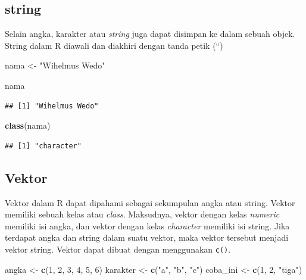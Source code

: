 \documentclass[]{book}
\newenvironment{Shaded}{\begin{snugshade}}{\end{snugshade}}
\newcommand{\KeywordTok}[1]{\textcolor[rgb]{0.13,0.29,0.53}{\textbf{#1}}}
\newcommand{\DecValTok}[1]{\textcolor[rgb]{0.00,0.00,0.81}{#1}}
\newcommand{\StringTok}[1]{\textcolor[rgb]{0.31,0.60,0.02}{#1}}
\newcommand{\NormalTok}[1]{#1}
\begin{document}
\subsection{string}\label{string}

Selain angka, karakter atau \emph{string} juga dapat disimpan ke dalam
sebuah objek. String dalam R diawali dan diakhiri dengan tanda petik
(``)

\begin{Shaded}
\begin{Highlighting}[]
\NormalTok{nama <-}\StringTok{ "Wihelmus Wedo"}

\NormalTok{nama}
\end{Highlighting}
\end{Shaded}

\begin{verbatim}
## [1] "Wihelmus Wedo"
\end{verbatim}

\begin{Shaded}
\begin{Highlighting}[]
\KeywordTok{class}\NormalTok{(nama)}
\end{Highlighting}
\end{Shaded}

\begin{verbatim}
## [1] "character"
\end{verbatim}

\subsection{Vektor}\label{vektor}

Vektor dalam R dapat dipahami sebagai sekumpulan angka atau string.
Vektor memiliki sebuah kelas atau \emph{class}. Maksudnya, vektor dengan
kelas \emph{numeric} memiliki isi angka, dan vektor dengan kelas
\emph{character} memiliki isi string. Jika terdapat angka dan string
dalam suatu vektor, maka vektor tersebut menjadi vektor string. Vektor
dapat dibuat dengan menggunakan \texttt{c()}.

\begin{Shaded}
\begin{Highlighting}[]
\NormalTok{angka <-}\StringTok{ }\KeywordTok{c}\NormalTok{(}\DecValTok{1}\NormalTok{, }\DecValTok{2}\NormalTok{, }\DecValTok{3}\NormalTok{, }\DecValTok{4}\NormalTok{, }\DecValTok{5}\NormalTok{, }\DecValTok{6}\NormalTok{)}
\NormalTok{karakter <-}\StringTok{ }\KeywordTok{c}\NormalTok{(}\StringTok{"a"}\NormalTok{, }\StringTok{"b"}\NormalTok{, }\StringTok{"c"}\NormalTok{)}
\NormalTok{coba_ini <-}\StringTok{ }\KeywordTok{c}\NormalTok{(}\DecValTok{1}\NormalTok{, }\DecValTok{2}\NormalTok{, }\StringTok{"tiga"}\NormalTok{)}
\end{Highlighting}
\end{Shaded}
\end{document}
